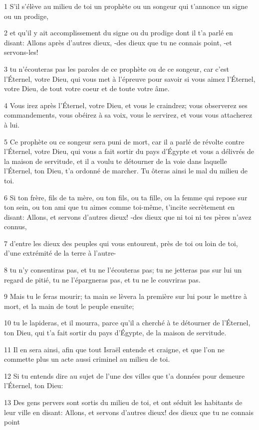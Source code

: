 \par 1 S'il s'élève au milieu de toi un prophète ou un songeur qui t'annonce un signe ou un prodige,
\par 2 et qu'il y ait accomplissement du signe ou du prodige dont il t'a parlé en disant: Allons après d'autres dieux, -des dieux que tu ne connais point, -et servons-les!
\par 3 tu n'écouteras pas les paroles de ce prophète ou de ce songeur, car c'est l'Éternel, votre Dieu, qui vous met à l'épreuve pour savoir si vous aimez l'Éternel, votre Dieu, de tout votre coeur et de toute votre âme.
\par 4 Vous irez après l'Éternel, votre Dieu, et vous le craindrez; vous observerez ses commandements, vous obéirez à sa voix, vous le servirez, et vous vous attacherez à lui.
\par 5 Ce prophète ou ce songeur sera puni de mort, car il a parlé de révolte contre l'Éternel, votre Dieu, qui vous a fait sortir du pays d'Égypte et vous a délivrés de la maison de servitude, et il a voulu te détourner de la voie dans laquelle l'Éternel, ton Dieu, t'a ordonné de marcher. Tu ôteras ainsi le mal du milieu de toi.
\par 6 Si ton frère, fils de ta mère, ou ton fils, ou ta fille, ou la femme qui repose sur ton sein, ou ton ami que tu aimes comme toi-même, t'incite secrètement en disant: Allons, et servons d'autres dieux! -des dieux que ni toi ni tes pères n'avez connus,
\par 7 d'entre les dieux des peuples qui vous entourent, près de toi ou loin de toi, d'une extrémité de la terre à l'autre-
\par 8 tu n'y consentiras pas, et tu ne l'écouteras pas; tu ne jetteras pas sur lui un regard de pitié, tu ne l'épargneras pas, et tu ne le couvriras pas.
\par 9 Mais tu le feras mourir; ta main se lèvera la première sur lui pour le mettre à mort, et la main de tout le peuple ensuite;
\par 10 tu le lapideras, et il mourra, parce qu'il a cherché à te détourner de l'Éternel, ton Dieu, qui t'a fait sortir du pays d'Égypte, de la maison de servitude.
\par 11 Il en sera ainsi, afin que tout Israël entende et craigne, et que l'on ne commette plus un acte aussi criminel au milieu de toi.
\par 12 Si tu entends dire au sujet de l'une des villes que t'a données pour demeure l'Éternel, ton Dieu:
\par 13 Des gens pervers sont sortis du milieu de toi, et ont séduit les habitants de leur ville en disant: Allons, et servons d'autres dieux! des dieux que tu ne connais point
